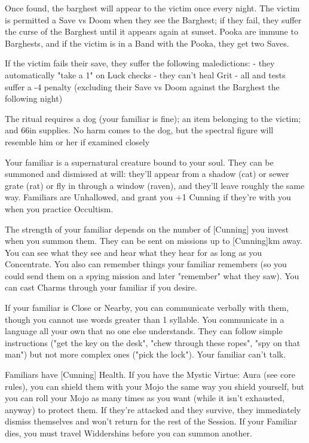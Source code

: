 Once found, the barghest will appear to the victim once every night.  The victim is permitted a Save vs Doom when they see the Barghest; if they fail, they suffer the curse of the Barghest until it appears again at sunset.  Pooka are immune to Barghests, and if the victim is in a Band with the Pooka, they get two Saves.

If the victim fails their save, they suffer the following maledictions:
- they automatically "take a 1" on Luck checks
- they can't heal Grit
- all \RO and \RB tests suffer a -4 penalty (excluding their Save vs Doom against the Barghest the following night)

The ritual requires a dog (your familiar is fine); an item belonging to the victim; and 66\AG in supplies.  No harm comes to the dog, but the spectral figure will resemble him or her if examined closely

\cbreak

\OCCULT[
  Name=Bind Familiar,
  Link=occultism-bind-familiar,
  Success=5+,
  Cost=666\FE
]

Your familiar is a supernatural creature bound to your soul.  They can be summoned and dismissed at will: they'll appear from a shadow (cat) or sewer grate (rat) or fly in through a window (raven), and they'll leave roughly the same way.  Familiars are Unhallowed, and grant you +1 Cunning if they're with you when you practice Occultism.  

The strength of your familiar depends on the number of [Cunning] you invest when you summon them.  They can be sent on missions up to [Cunning]km away. You can see what they see and hear what they hear for as long as you Concentrate. You also can remember things your familiar remembers (so you could send them on a spying mission and later "remember" what they saw). You can cast Charms through your familiar if you desire.

If your familiar is Close or Nearby, you can communicate verbally with them, though you cannot use words greater than 1 syllable.  You communicate in a language all your own that no one else understands.  They can follow simple instructions ("get the key on the desk", "chew through these ropes", "spy on that man") but not more complex ones ("pick the lock").  Your familiar can't talk.

Familiars have [Cunning] Health.  If you have the Mystic Virtue: Aura (see core rules), you can shield them with your Mojo the same way you shield yourself, but you can roll your Mojo as many times as you want (while it isn't exhausted, anyway) to protect them.  If they're attacked and they survive, they immediately dismiss themselves and won't return for the rest of the Session. If your Familiar dies, you must travel Widdershins before you can summon another.  

